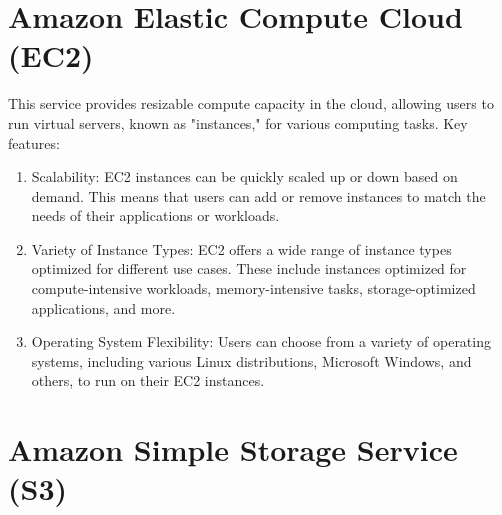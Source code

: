 \documentclass[11pt,a4paper,oneside]{report}
\begin{document}
\section{Amazon Elastic Compute Cloud (EC2)}

This service provides resizable compute capacity in the cloud, allowing users to run virtual servers, known as "instances," for various computing tasks.
Key features:
\begin{enumerate}
  \item Scalability: EC2 instances can be quickly scaled up or down based on demand. This means that users can add or remove instances to match the needs of their applications or workloads.
  \item Variety of Instance Types: EC2 offers a wide range of instance types optimized for different use cases. These include instances optimized for compute-intensive workloads, memory-intensive tasks, storage-optimized applications, and more.
  \item Operating System Flexibility: Users can choose from a variety of operating systems, including various Linux distributions, Microsoft Windows, and others, to run on their EC2 instances.
\end{enumerate}
\section{Amazon Simple Storage Service (S3)}
\end{document}
